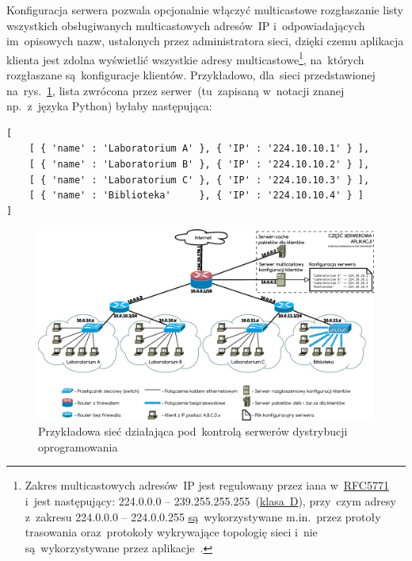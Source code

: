 \documentclass[thesis]{subfiles}
\begin{document}
Konfiguracja serwera pozwala opcjonalnie włączyć multicastowe rozgłaszanie listy wszystkich obsługiwanych multicastowych adresów~IP i~odpowiadających im~opisowych nazw, ustalonych przez administratora sieci, dzięki czemu aplikacja klienta jest zdolna wyświetlić wszystkie adresy multicastowe\footnote{Zakres multicastowych adresów~IP jest regulowany przez \gls{iana} w~\href{https://tools.ietf.org/html/rfc5771}{RFC5771} i~jest następujący: 224.0.0.0 -- 239.255.255.255~(\href{https://en.wikipedia.org/wiki/Classful_network\#Classful_addressing_definition}{klasa~D}), przy~czym adresy z~zakresu 224.0.0.0 -- 224.0.0.255 \href{https://www.iana.org/assignments/multicast-addresses/multicast-addresses.xhtml}{są}~wykorzystywane m.in.~przez protoły trasowania oraz~protokoły wykrywające topologię sieci i~nie są~wykorzystywane przez aplikacje~\cite{rfc5771}.}, na~których rozgłaszane są~konfiguracje klientów. Przykładowo, dla~sieci przedstawionej na~rys.~\ref{fig:simple-network}, lista zwrócona przez serwer~(tu~zapisaną w~notacji znanej np.~z~języka Python) byłaby następująca:
\begin{lstlisting}[numbers=none,frame=none]
[
	[ { 'name' : 'Laboratorium A' }, { 'IP' : '224.10.10.1' } ],
	[ { 'name' : 'Laboratorium B' }, { 'IP' : '224.10.10.2' } ],
	[ { 'name' : 'Laboratorium C' }, { 'IP' : '224.10.10.3' } ],
	[ { 'name' : 'Biblioteka'     }, { 'IP' : '224.10.10.4' } ]
]
\end{lstlisting}

\begin{figure}
	\centering
	\includegraphics[width=\textwidth]{img/przykladowa-siec-wireless}
	\caption{Przykładowa sieć działająca pod~kontrolą serwerów dystrybucji oprogramowania}
	\label{fig:simple-network}
\end{figure}

\end{document}
